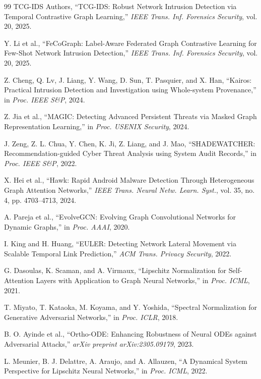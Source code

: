 \documentclass[journal]{IEEEtran}
\theoremstyle{plain}
\theoremstyle{definition}
\theoremstyle{remark}
\begin{document}
\begin{thebibliography}{99}
TCG-IDS Authors, ``TCG-IDS: Robust Network Intrusion Detection via Temporal Contrastive Graph Learning,'' \textit{IEEE Trans. Inf. Forensics Security}, vol. 20, 2025.

Y. Li et al., ``FeCoGraph: Label-Aware Federated Graph Contrastive Learning for Few-Shot Network Intrusion Detection,'' \textit{IEEE Trans. Inf. Forensics Security}, vol. 20, 2025.

Z. Cheng, Q. Lv, J. Liang, Y. Wang, D. Sun, T. Pasquier, and X. Han, ``Kairos: Practical Intrusion Detection and Investigation using Whole-system Provenance,'' in \textit{Proc. IEEE S\&P}, 2024.

Z. Jia et al., ``MAGIC: Detecting Advanced Persistent Threats via Masked Graph Representation Learning,'' in \textit{Proc. USENIX Security}, 2024.

J. Zeng, Z. L. Chua, Y. Chen, K. Ji, Z. Liang, and J. Mao, ``SHADEWATCHER: Recommendation-guided Cyber Threat Analysis using System Audit Records,'' in \textit{Proc. IEEE S\&P}, 2022.

X. Hei et al., ``Hawk: Rapid Android Malware Detection Through Heterogeneous Graph Attention Networks,'' \textit{IEEE Trans. Neural Netw. Learn. Syst.}, vol. 35, no. 4, pp. 4703--4713, 2024.

A. Pareja et al., ``EvolveGCN: Evolving Graph Convolutional Networks for Dynamic Graphs,'' in \textit{Proc. AAAI}, 2020.

I. King and H. Huang, ``EULER: Detecting Network Lateral Movement via Scalable Temporal Link Prediction,'' \textit{ACM Trans. Privacy Security}, 2022.

G. Dasoulas, K. Scaman, and A. Virmaux, ``Lipschitz Normalization for Self-Attention Layers with Application to Graph Neural Networks,'' in \textit{Proc. ICML}, 2021.

T. Miyato, T. Kataoka, M. Koyama, and Y. Yoshida, ``Spectral Normalization for Generative Adversarial Networks,'' in \textit{Proc. ICLR}, 2018.

B. O. Ayinde et al., ``Ortho-ODE: Enhancing Robustness of Neural ODEs against Adversarial Attacks,'' \textit{arXiv preprint arXiv:2305.09179}, 2023.

L. Meunier, B. J. Delattre, A. Araujo, and A. Allauzen, ``A Dynamical System Perspective for Lipschitz Neural Networks,'' in \textit{Proc. ICML}, 2022.


\end{thebibliography}
\end{document}

